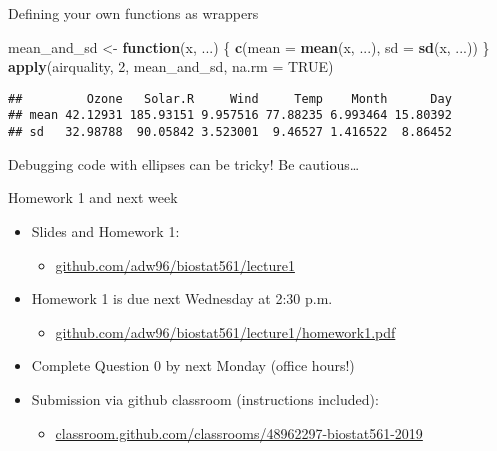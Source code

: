 \documentclass[ignorenonframetext,]{beamer}
\newenvironment{Shaded}{\begin{snugshade}}{\end{snugshade}}
\newcommand{\ControlFlowTok}[1]{\textcolor[rgb]{0.13,0.29,0.53}{\textbf{#1}}}
\newcommand{\DataTypeTok}[1]{\textcolor[rgb]{0.13,0.29,0.53}{#1}}
\newcommand{\DecValTok}[1]{\textcolor[rgb]{0.00,0.00,0.81}{#1}}
\newcommand{\KeywordTok}[1]{\textcolor[rgb]{0.13,0.29,0.53}{\textbf{#1}}}
\newcommand{\NormalTok}[1]{#1}
\newcommand{\OtherTok}[1]{\textcolor[rgb]{0.56,0.35,0.01}{#1}}
\newcommand{\StringTok}[1]{\textcolor[rgb]{0.31,0.60,0.02}{#1}}
\providecommand{\tightlist}{%
  \setlength{\itemsep}{0pt}\setlength{\parskip}{0pt}}
\begin{document}
\begin{frame}[fragile]{Defining your own functions as wrappers}
\protect\hypertarget{defining-your-own-functions-as-wrappers}{}

\begin{Shaded}
\begin{Highlighting}[]
\NormalTok{mean_and_sd <-}\StringTok{ }\ControlFlowTok{function}\NormalTok{(x, ...) \{ }\KeywordTok{c}\NormalTok{(}\DataTypeTok{mean =} \KeywordTok{mean}\NormalTok{(x, ...),}
        \DataTypeTok{sd =} \KeywordTok{sd}\NormalTok{(x, ...)) \}}
\KeywordTok{apply}\NormalTok{(airquality, }\DecValTok{2}\NormalTok{, mean_and_sd, }\DataTypeTok{na.rm =} \OtherTok{TRUE}\NormalTok{)}
\end{Highlighting}
\end{Shaded}

\begin{verbatim}
##         Ozone   Solar.R     Wind     Temp    Month      Day
## mean 42.12931 185.93151 9.957516 77.88235 6.993464 15.80392
## sd   32.98788  90.05842 3.523001  9.46527 1.416522  8.86452
\end{verbatim}

Debugging code with ellipses can be tricky! Be cautious\ldots{}

\end{frame}

\begin{frame}{Homework 1 and next week}
\protect\hypertarget{homework-1-and-next-week}{}

\begin{itemize}
\tightlist
\item
  Slides and Homework 1:

  \begin{itemize}
  \tightlist
  \item
    \url{github.com/adw96/biostat561/lecture1}
  \end{itemize}
\item
  Homework 1 is due next Wednesday at 2:30 p.m.

  \begin{itemize}
  \tightlist
  \item
    \url{github.com/adw96/biostat561/lecture1/homework1.pdf}
  \end{itemize}
\item
  Complete Question 0 by next Monday (office hours!)
\item
  Submission via github classroom (instructions included):

  \begin{itemize}
  \tightlist
  \item
    \url{classroom.github.com/classrooms/48962297-biostat561-2019}
  \end{itemize}
\end{itemize}

\end{frame}
\end{document}
